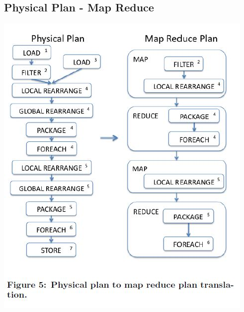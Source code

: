 \subsection{Physical Plan - Map Reduce}
\begin{frame}
\centerline{\includegraphics[scale=0.40]{Images/Physical_MapReduce.JPG}}
\let\thefootnote\relax{}
\end{frame}



